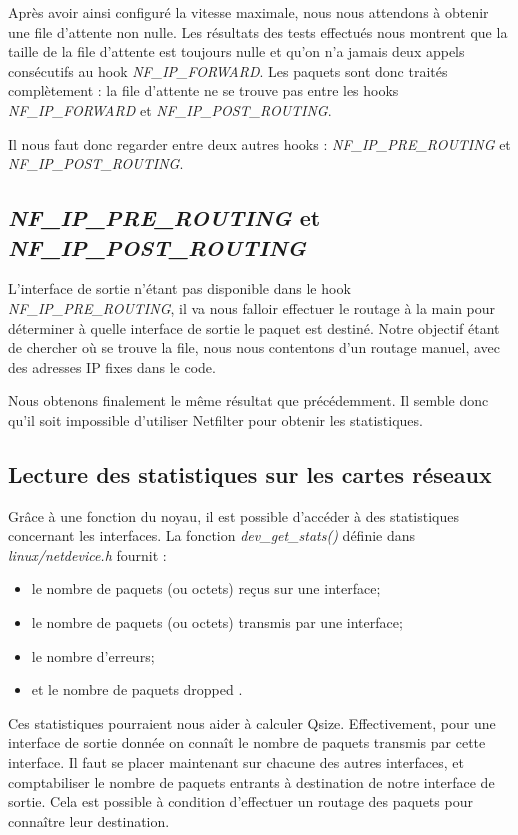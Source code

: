 \documentclass[a4paper]{article}
\begin{document}
Après avoir ainsi configuré la vitesse maximale,
nous nous attendons à obtenir une file d’attente non nulle.
Les résultats des tests effectués nous montrent que la taille
de la file d’attente est toujours nulle et qu'on n'a jamais
deux appels consécutifs au hook \textit{NF\_IP\_FORWARD}. 
Les paquets sont donc traités complètement : la file d'attente
ne se trouve pas entre les hooks
\textit{NF\_IP\_FORWARD} et \textit{NF\_IP\_POST\_ROUTING}.

Il nous faut donc regarder entre deux autres 
hooks : \textit{NF\_IP\_PRE\_ROUTING} et \textit{NF\_IP\_POST\_ROUTING}.

\subsection{\textit{NF\_IP\_PRE\_ROUTING} et \textit{NF\_IP\_POST\_ROUTING}}
L'interface de sortie n'étant pas disponible dans le hook \textit{NF\_IP\_PRE\_ROUTING},
il va nous falloir effectuer le routage à la main pour déterminer à quelle interface de sortie le paquet est destiné. Notre
objectif étant de chercher où se trouve la file, nous nous
contentons d'un routage manuel, avec des adresses IP fixes dans le code.

Nous obtenons finalement le même résultat que précédemment. 
Il semble donc qu'il soit impossible d'utiliser Netfilter pour
obtenir les statistiques. 

\subsection{Lecture des statistiques sur les cartes réseaux}
Grâce à une fonction du noyau, il est possible d’accéder à des
statistiques concernant les interfaces. La fonction \textit{dev\_get\_stats()}
définie dans \textit{linux/netdevice.h} fournit :
\begin{itemize}
	\item le nombre de paquets (ou octets) reçus sur une interface;
	\item le nombre de paquets (ou octets) transmis par une interface;
	\item le nombre d’erreurs;
	\item et le nombre de paquets \og dropped \fg.
\end{itemize}

Ces statistiques pourraient nous aider à calculer Qsize. 
Effectivement, pour une interface de sortie donnée on connaît le
nombre de paquets transmis par cette interface.
Il faut se placer maintenant sur chacune des autres interfaces, et
comptabiliser le nombre de paquets entrants à destination
de notre interface de sortie. Cela est possible à condition
d'effectuer un routage des paquets pour connaître leur destination.
\end{document}
